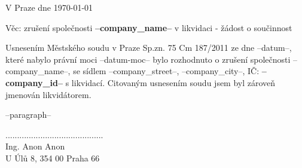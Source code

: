 \documentclass{../myletter}
\begin{document}
\begin{letter}{}
\opening{V Praze dne \today}
Věc: zrušení společnosti \textbf{--company_name--} v likvidaci - žádost o součinnost                  

Usnesením Městského soudu v Praze Sp.zn. 75 Cm 187/2011 ze dne --datum--, které nabylo právní moci --datum-moc-- bylo rozhodnuto o zrušení společnosti --company_name--, se sídlem --company_street--, --company_city--,  IČ: \textbf{--company_id--} s likvidací. Citovaným usnesením soudu jsem byl zároveň jmenován likvidátorem.  

--paragraph--

\hspace*{5cm}

\closing{..........................................\\ Ing. Anon Anon \\ U Úlů 8, 354 00 Praha 66}
\end{letter}
\end{document}

